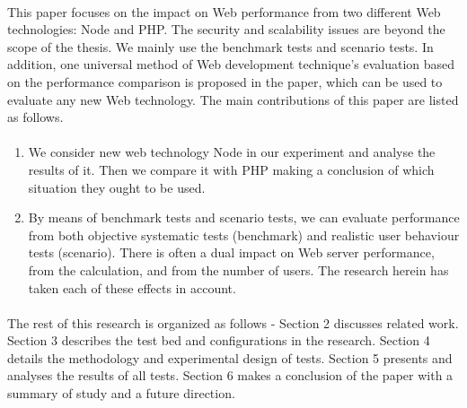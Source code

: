 \documentclass[a4paper, onecolumn, oneside, 11pt, wide, floatssmall]{mwrep}
\begin{document}
\paragraph{}
This paper focuses on the impact on Web performance from two different Web technologies: Node and PHP. The security and scalability issues are beyond the scope of the thesis. We mainly use the benchmark tests and scenario tests. In addition, one universal method of Web development technique’s evaluation based on the performance comparison is proposed in the paper, which can be used to evaluate any new Web technology. The main contributions of this paper are listed as follows. 
\paragraph{}
\begin{enumerate}
    \item We consider new web technology Node in our experiment and analyse the results of it. Then we compare it with PHP making a conclusion of which situation they ought to be used. 
    \item By means of benchmark tests and scenario tests, we can evaluate performance from both objective systematic tests (benchmark) and realistic user behaviour tests (scenario). There is often a dual impact on Web server performance, from the calculation, and from the number of users. The research herein has taken each of these effects in account.
\end{enumerate} 
\paragraph{}

The rest of this research is organized as follows - Section 2 discusses related work. Section 3 describes the test bed and configurations in the research. Section 4 details the methodology and experimental design of tests. Section 5 presents and analyses the results of all tests. Section 6 makes a conclusion of the paper with a summary of study and a future direction.
\end{document}
